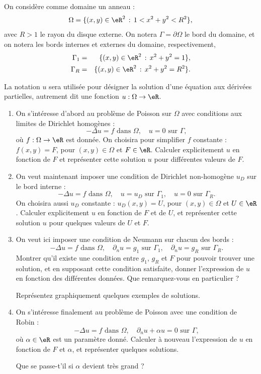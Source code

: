 \begin{exercice}\label{exoChEDP_Anneau}

On considère comme domaine un anneau : 
$$\Omega = \{ (x,y)\in\eR^2 \, : \, 1 < x^2 + y^2 < R^2 \},$$
avec $R > 1$ le rayon du disque externe.
On notera $\Gamma = \partial \Omega$ le bord du domaine, et on notera les bords internes et externes du domaine, respectivement,
\begin{eqnarray*}
\Gamma_1 &=& \{ (x,y)\in\eR^2 \, : \,  x^2 + y^2 = 1 \},\\
\Gamma_R &=& \{ (x,y)\in\eR^2 \, : \,  x^2 + y^2 = R^2 \}.
\end{eqnarray*}

La notation $u$ sera utilisée pour désigner la solution d'une équation aux dérivées partielles, autrement dit une fonction $u : \Omega \rightarrow \eR$.

\begin{enumerate}

\item On s'intéresse d'abord au problème de Poisson sur $\Omega$ avec conditions aux limites de Dirichlet homogènes :
\[
- \Delta u = f \mbox{ dans } \Omega, \quad u = 0 \mbox{ sur } \Gamma,
\]
où $f : \Omega \rightarrow \eR$ est donnée. On choisira pour simplifier $f$ constante : $f(x,y) = F$, pour $(x,y)\in\Omega$ et $F\in\eR$.
Calculer explicitement $u$ en fonction de $F$ et représenter cette solution $u$ pour différentes valeurs de $F$.

\item On veut maintenant imposer une condition de Dirichlet non-homogène $u_D$ sur le bord interne :
\[
- \Delta u = f \mbox{ dans } \Omega, \quad u = u_D \mbox{ sur } \Gamma_1,
\quad u = 0 \mbox{ sur } \Gamma_R.
\]
On choisira aussi $u_D$ constante : $u_D(x,y) = U$, pour $(x,y)\in\Omega$ et $U\in\eR$.
Calculer explicitement $u$ en fonction de $F$ et de $U$, et représenter cette solution $u$ pour quelques valeurs de $U$ et $F$.

\item On veut ici imposer une condition de Neumann sur chacun des bords :
\[
- \Delta u = f \mbox{ dans } \Omega, \quad \partial_n u = g_1 \mbox{ sur } \Gamma_1,
\quad \partial_n u = g_R \mbox{ sur } \Gamma_R.
\]
Montrer qu'il existe une condition entre $g_1$, $g_R$ et $F$ pour pouvoir trouver une solution, et en supposant cette condition satisfaite, donner l'expression de $u$ en fonction des différentes données. Que remarquez-vous en particulier ?

Représentez graphiquement quelques exemples de solutions.

\item On s'intéresse finalement au problème de Poisson avec une condition de Robin :
\[
- \Delta u = f \mbox{ dans } \Omega, \quad \partial_n u + \alpha u = 0 \mbox{ sur } \Gamma,
\]
où $\alpha \in \eR$ est un paramètre donné. Calculer à nouveau l'expression de $u$ en fonction de $F$ et $\alpha$, et représenter quelques solutions.

Que se passe-t'il si $\alpha$ devient très grand ?

\end{enumerate}

\end{exercice}

